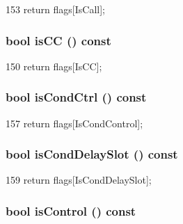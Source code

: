\begin{DoxyCode}
153 { return flags[IsCall]; }
\end{DoxyCode}
\hypertarget{classStaticInst_aeede7bb34cb5eee4979cd2f6e9f361dc}{
\subsubsection[{isCC}]{\setlength{\rightskip}{0pt plus 5cm}bool isCC () const}}
\label{classStaticInst_aeede7bb34cb5eee4979cd2f6e9f361dc}



\begin{DoxyCode}
150 { return flags[IsCC]; }
\end{DoxyCode}
\hypertarget{classStaticInst_a941920262acf4437e241c7600b3007ff}{
\subsubsection[{isCondCtrl}]{\setlength{\rightskip}{0pt plus 5cm}bool isCondCtrl () const}}
\label{classStaticInst_a941920262acf4437e241c7600b3007ff}



\begin{DoxyCode}
157 { return flags[IsCondControl]; }
\end{DoxyCode}
\hypertarget{classStaticInst_a50a12c82ee75e53f92c0852ae3ea71e8}{
\subsubsection[{isCondDelaySlot}]{\setlength{\rightskip}{0pt plus 5cm}bool isCondDelaySlot () const}}
\label{classStaticInst_a50a12c82ee75e53f92c0852ae3ea71e8}



\begin{DoxyCode}
159 { return flags[IsCondDelaySlot]; }
\end{DoxyCode}
\hypertarget{classStaticInst_a2ff117edfab9c8486802c441ac331086}{
\subsubsection[{isControl}]{\setlength{\rightskip}{0pt plus 5cm}bool isControl () const}}
\label{classStaticInst_a2ff117edfab9c8486802c441ac331086}



